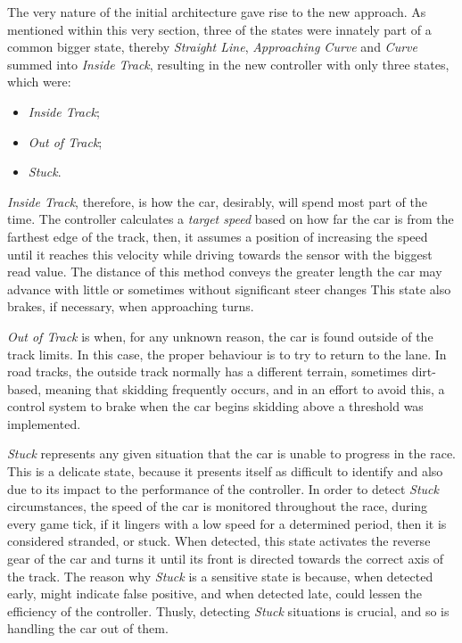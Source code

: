 	The very nature of the initial architecture gave rise to the new approach. As mentioned within this very section,
	three of the states were innately part of a common bigger state, thereby \emph{Straight Line},
	\emph{Approaching Curve} and \emph{Curve} summed into \emph{Inside Track}, resulting in the new controller with
	only three states, which were:
	
	\begin{itemize}
		
		\item \emph{Inside Track};
		
		\item \emph{Out of Track};
		
		\item \emph{Stuck}.
		
	\end{itemize}
	
	\emph{Inside Track}, therefore, is how the car, desirably, will spend most part of the time. The controller
	calculates a \emph{target speed} based on how far the car is from the farthest edge of the track, then, it assumes
	a position of increasing the speed until it reaches this velocity while driving towards the sensor with the
	biggest read value. The distance of this method conveys the greater length the car may advance with little or
	sometimes without significant steer changes This state also brakes, if necessary, when approaching turns.
		
	\emph{Out of Track} is when, for any unknown reason, the car is found outside of the track limits. In this case,
	the proper behaviour is to try to return to the lane. In road tracks, the outside track normally has a different
	terrain, sometimes dirt-based, meaning that skidding frequently occurs, and in an effort to avoid this, a control
	system to brake when the car begins skidding above a threshold was implemented.
	
	\emph{Stuck} represents any given situation that the car is unable to progress in the race. This is a delicate
	state, because it presents itself as difficult to identify and also due to its impact to the performance of the
	controller. In order to detect \emph{Stuck} circumstances, the speed of the car is monitored throughout the race,
	during every game tick, if it lingers with a low speed for a determined period, then it is considered stranded,
	or stuck. When detected, this state activates the reverse gear of the car and turns it until its front is
	directed towards the correct axis of the track. The reason why \emph{Stuck} is a sensitive state is because, when
	detected early, might indicate false positive, and when detected late, could lessen the efficiency of the
	controller. Thusly, detecting \textit{Stuck} situations is crucial, and so is handling the car out of them.
	
